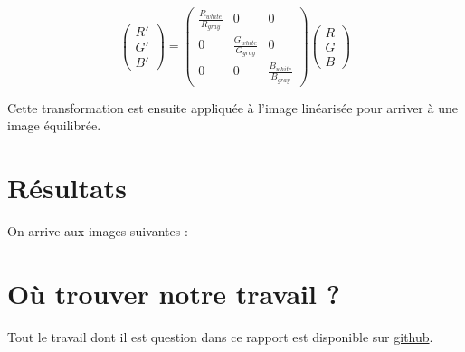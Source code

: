 \documentclass[12pt]{article}
\begin{document}
\begin{equation}
\begin{pmatrix}
R' \\
G' \\
B'
\end{pmatrix} = 
\begin{pmatrix}
\frac{R_{white}}{R_{gray}} & 0 & 0 \\
0 & \frac{G_{white}}{G_{gray}} & 0 \\
0 & 0 & \frac{B_{white}}{B_{gray}}
\end{pmatrix}
\begin{pmatrix}
R \\
G \\
B
\end{pmatrix}
\end{equation}

Cette transformation est ensuite appliquée à l'image linéarisée pour arriver à une image équilibrée.

\clearpage

\section{Résultats}

On arrive aux images suivantes :



\clearpage

\section{Où trouver notre travail ?}

Tout le travail dont il est question dans ce rapport est disponible sur \href{https://github.com/antoinedenovembre/colorimetry_project_2}{github}.
\end{document}
